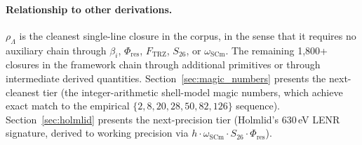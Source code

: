 \paragraph{Relationship to other derivations.}
$\rho_\Lambda$ is the cleanest single-line closure in the corpus, in the
sense that it requires no auxiliary chain through $\beta_i$, $\Phi_{\text{res}}$,
$F_{\text{TRZ}}$, $S_{26}$, or $\omega_{\text{SCm}}$. The remaining 1,800+
closures in the framework chain through additional primitives or through
intermediate derived quantities. Section~\ref{sec:magic_numbers} presents
the next-cleanest tier (the integer-arithmetic shell-model magic numbers,
which achieve exact match to the empirical $\{2,8,20,28,50,82,126\}$
sequence). Section~\ref{sec:holmlid} presents the next-precision tier
(Holmlid's 630\,eV LENR signature, derived to working precision via
$h\cdot\omega_{\text{SCm}}\cdot S_{26}\cdot\Phi_{\text{res}}$).

